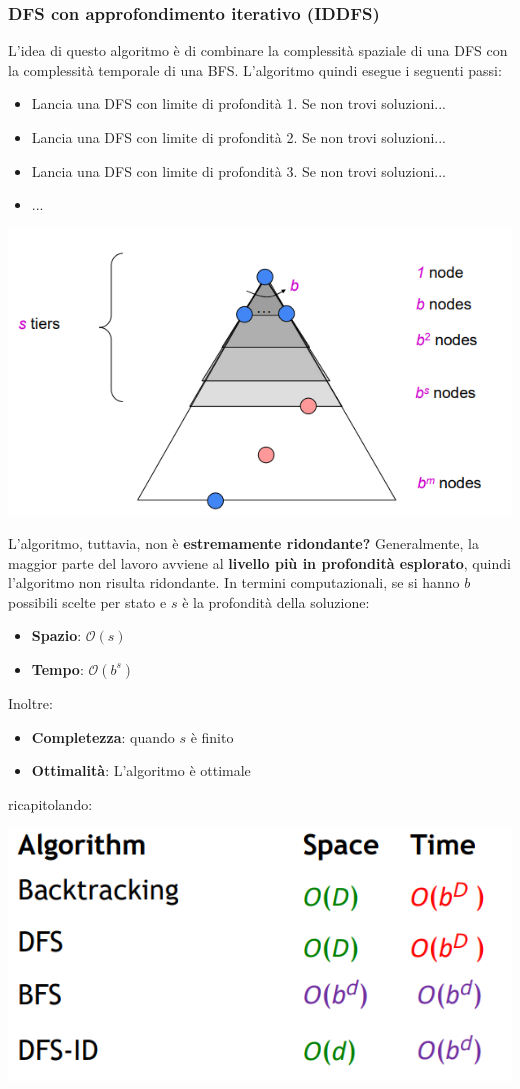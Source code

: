 \documentclass[12pt]{article}
\begin{document}
\subsubsection{DFS con approfondimento iterativo (IDDFS)}
L'idea di questo algoritmo è di combinare la complessità spaziale di una DFS con la complessità
temporale di una BFS. L'algoritmo quindi esegue i seguenti passi:
\begin{itemize}
    \item Lancia una DFS con limite di profondità 1. Se non trovi soluzioni... 
    \item Lancia una DFS con limite di profondità 2. Se non trovi soluzioni... 
    \item Lancia una DFS con limite di profondità 3. Se non trovi soluzioni... 
    \item ...
\end{itemize}
\begin{center}
    \includegraphics[width = 0.70\linewidth]{Images/32.PNG}
\end{center}
L'algoritmo, tuttavia, non è \textbf{estremamente ridondante?}
Generalmente, la maggior parte del lavoro avviene al \textbf{livello più in profondità esplorato},
quindi l'algoritmo non risulta ridondante. In termini computazionali, se si hanno $b$ possibili scelte per stato
e $s$ è la profondità della soluzione:
\begin{itemize}
    \item \textbf{Spazio}: $\mathcal{O}(s)$
    \item \textbf{Tempo}: $\mathcal{O}(b^s)$
\end{itemize}
\newpage \noindent
Inoltre:
\begin{itemize}
    \item \textbf{Completezza}: quando $s$ è finito
    \item \textbf{Ottimalità}: L'algoritmo è ottimale
\end{itemize}
ricapitolando:
\begin{center}
    \includegraphics[width = 0.50\linewidth]{Images/34.PNG}
\end{center}
\end{document}
